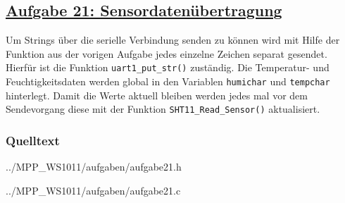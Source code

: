 \subsection
{\href{http://cst.mi.fu-berlin.de/intern/19606-P-MPP/Aufgaben/040702.html}
{Aufgabe 21: Sensordatenübertragung}}
Um Strings über die serielle Verbindung senden zu können wird mit Hilfe der Funktion aus der vorigen Aufgabe jedes einzelne Zeichen separat gesendet. Hierfür ist die Funktion {\tt \small uart1\_put\_str()} zuständig. Die Temperatur- und Feuchtigkeitsdaten werden global in den Variablen {\tt humichar} und {\tt tempchar} hinterlegt. Damit die Werte aktuell bleiben werden jedes mal vor dem Sendevorgang diese mit der Funktion {\tt SHT11\_Read\_Sensor()} aktualisiert.

\subsubsection*{Quelltext}

{../MPP_WS1011/aufgaben/aufgabe21.h}


{../MPP_WS1011/aufgaben/aufgabe21.c}
